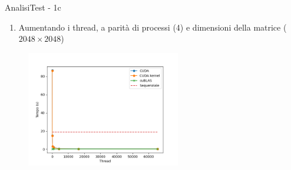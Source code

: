 \begin{frame}{Analisi}{Test - 1c}
    \begin{enumerate}
        \item[1c] Aumentando i thread, a parità di processi (4) e dimensioni della matrice ($2048 \times 2048$)
    \end{enumerate}

    \begin{figure}[H]
        \centering
        \includegraphics[width=0.6\textwidth]{./imgs/graphs/caso_a2.png}
    \end{figure}
\end{frame}

